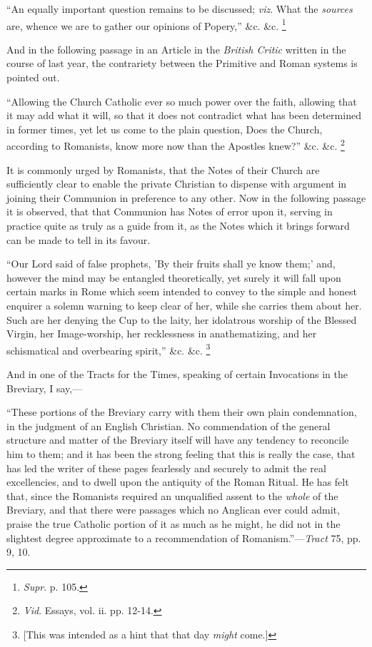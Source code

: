 ``An equally important question remains to be
discussed; \emph{viz}. What the \emph{sources} are, whence we are to
gather our opinions of Popery,'' \&c. \&c. \footnote{\emph{Supr}. p. 105.}

And in the following passage in an Article in the
\emph{British Critic} written in the course of last year, the
contrariety between the Primitive and Roman systems is pointed out.

``Allowing the Church Catholic ever so much power
over the faith, allowing that it may add what it will, so that it does
not contradict what has been determined in former times, yet let us
come to the plain question, Does the Church, according to Romanists,
know more now than the Apostles knew?'' \&c. \&c. \footnote{\emph{Vid}. Essays, vol. ii. pp.
12-14.}

It is commonly urged by Romanists, that the Notes
of their Church are sufficiently clear to enable the private
Christian to dispense with argument in joining their Communion in
preference to any other. Now in the following passage it is observed,
that that Communion has Notes of error upon it, serving in practice
quite as truly as a guide from it, as the Notes which it brings
forward can be made to tell in its favour.

``Our
Lord said of false prophets, 'By their fruits shall ye know them;'
and, however the mind may be entangled theoretically, yet surely it
will fall upon certain marks in Rome which seem intended to convey to
the simple and honest enquirer a solemn warning to keep clear of her,
while she carries them about her. Such are her denying the Cup to the
laity, her idolatrous worship of the Blessed Virgin, her
Image-worship, her recklessness in anathematizing, and her
schismatical and overbearing spirit,'' \&c. \&c. \footnote{[This was intended as a hint that that day \emph{might} come.]}

And in one of the Tracts for the Times, speaking
of certain Invocations in the Breviary, I say,—

``These
portions of the Breviary carry with them their own plain condemnation,
in the judgment of an English Christian. No commendation of the
general structure and matter of the Breviary itself will have any
tendency to reconcile him to them; and it has been the strong feeling
that this is really the case, that has led the writer of these pages
fearlessly and securely to admit the real excellencies, and to dwell
upon the antiquity of the Roman Ritual. He has felt that, since the
Romanists required an unqualified assent to the \emph{whole} of the Breviary,
and that there were passages which no Anglican ever could admit,
praise the true Catholic portion of it as much as he might, he did not
in the slightest degree approximate to a recommendation of Romanism.''—\emph{Tract}
75, pp. 9, 10.


